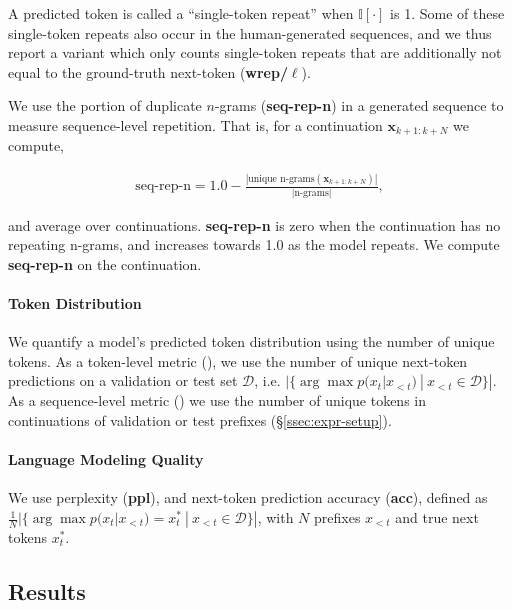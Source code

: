 A predicted token is called a ``single-token repeat'' when $\mathbb{I}\left[\cdot\right]$ is 1. Some of these single-token repeats also occur in the human-generated sequences, and we thus report a variant which only counts single-token repeats that are additionally not equal to the ground-truth next-token (\textbf{wrep/$\ell$}).

We use the portion of duplicate $n$-grams (\textbf{seq-rep-n}) in a generated sequence to measure sequence-level repetition. That is, for a continuation $\textbf{x}_{k+1:k+N}$ we compute,

\begin{small}
\begin{align}
    \text{seq-rep-n} = 1.0 - \frac{|\text{unique n-grams}(\textbf{x}_{k+1:k+N})|}{|\text{n-grams}|},
\end{align}
\end{small}

and average over continuations. \textbf{seq-rep-n} is zero when the continuation has no repeating n-grams, and increases towards 1.0 as the model repeats. We compute \textbf{seq-rep-n} on the continuation.

\paragraph{Token Distribution} 

We quantify a model's predicted token distribution using the number of unique tokens. As a token-level metric (\textbf{}), we use the number of unique next-token predictions on a validation or test set $\mathcal{D}$, i.e. $|\{\arg\max p(x_{t}|x_{<t})\ |\ x_{<t}\in \mathcal{D}\}|$. As a sequence-level metric (\textbf{}) we use the number of unique tokens in continuations of validation or test prefixes (\S\ref{ssec:expr-setup}). 

\paragraph{Language Modeling Quality} We use perplexity (\textbf{ppl}), and next-token prediction accuracy (\textbf{acc}), defined as $\frac{1}{N}|\{\arg\max p(x_{t}|x_{<t})=x_t^*\ |\ x_{<t}\in \mathcal{D}\}|$, with $N$ prefixes $x_{<t}$ and true next tokens $x_t^*$.

\subsection{Results}
\label{expr:main}

